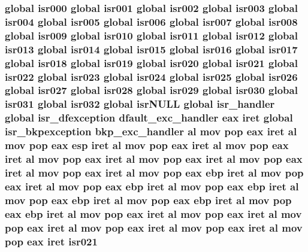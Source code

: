 \subsubsection[{\texorpdfstring{isr021}{isr021}}]{\setlength{\rightskip}{0pt plus 5cm}global {\bf isr000} global {\bf isr001} global {\bf isr002} global {\bf isr003} global {\bf isr004} global {\bf isr005} global {\bf isr006} global {\bf isr007} global {\bf isr008} global {\bf isr009} global {\bf isr010} global {\bf isr011} global {\bf isr012} global {\bf isr013} global {\bf isr014} global {\bf isr015} global {\bf isr016} global {\bf isr017} global {\bf isr018} global {\bf isr019} global {\bf isr020} global isr021 global {\bf isr022} global {\bf isr023} global {\bf isr024} global {\bf isr025} global {\bf isr026} global {\bf isr027} global {\bf isr028} global {\bf isr029} global {\bf isr030} global {\bf isr031} global isr032 global isr\+N\+U\+LL global isr\+\_\+handler global {\bf isr\+\_\+dfexception} {\bf dfault\+\_\+exc\+\_\+handler} eax iret global {\bf isr\+\_\+bkpexception} {\bf bkp\+\_\+exc\+\_\+handler} {\bf al} {\bf mov} pop eax iret {\bf al} {\bf mov} pop eax esp iret {\bf al} {\bf mov} pop eax iret {\bf al} {\bf mov} pop eax iret {\bf al} {\bf mov} pop eax iret {\bf al} {\bf mov} pop eax iret {\bf al} {\bf mov} pop eax iret {\bf al} {\bf mov} pop eax iret {\bf al} {\bf mov} pop eax ebp iret {\bf al} {\bf mov} pop eax iret {\bf al} {\bf mov} pop eax ebp iret {\bf al} {\bf mov} pop eax ebp iret {\bf al} {\bf mov} pop eax ebp iret {\bf al} {\bf mov} pop eax ebp iret {\bf al} {\bf mov} pop eax ebp iret {\bf al} {\bf mov} pop eax iret {\bf al} {\bf mov} pop eax iret {\bf al} {\bf mov} pop eax iret {\bf al} {\bf mov} pop eax iret {\bf al} {\bf mov} pop eax iret {\bf al} {\bf mov} pop eax iret isr021}\hypertarget{isrs_8as_ae565aee9ab97333fac13a111416c56eb}{}\label{isrs_8as_ae565aee9ab97333fac13a111416c56eb}
